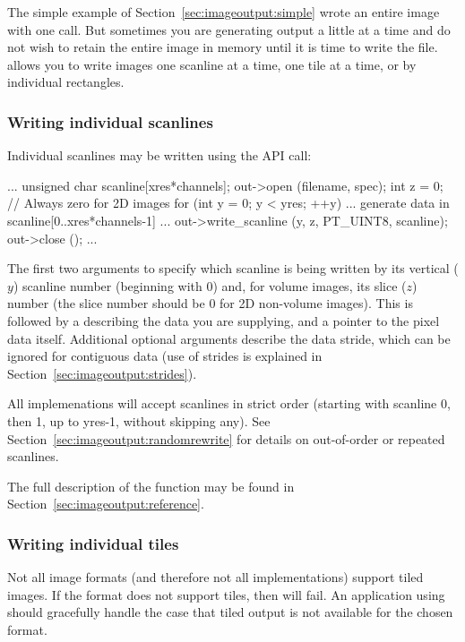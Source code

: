 The simple example of Section~\ref{sec:imageoutput:simple} wrote an
entire image with one call.  But sometimes you are generating output a
little at a time and do not wish to retain the entire image in memory
until it is time to write the file.  \product allows you to write images
one scanline at a time, one tile at a time, or by individual rectangles.

\subsubsection{Writing individual scanlines}

Individual scanlines may be written using the \writescanline API
call:

\begin{code}
        ...
        unsigned char scanline[xres*channels];
        out->open (filename, spec);
        int z = 0;   // Always zero for 2D images
        for (int y = 0;  y < yres;  ++y) {
            ... generate data in scanline[0..xres*channels-1] ...
            out->write_scanline (y, z, PT_UINT8, scanline);
        }
        out->close ();
        ...
\end{code}

The first two arguments to \writescanline specify which scanline is
being written by its vertical ($y$) scanline number (beginning with 0)
and, for volume images, its slice ($z$) number (the slice number should
be 0 for 2D non-volume images).  This is followed by a \ParamBaseType
describing the data you are supplying, and a pointer to the pixel data
itself.  Additional optional arguments describe the data stride, which
can be ignored for contiguous data (use of strides is explained in
Section~\ref{sec:imageoutput:strides}).

All \ImageOutput implemenations will accept scanlines in strict order
(starting with scanline 0, then 1, up to {\kw yres-1}, without skipping
any).  See Section~\ref{sec:imageoutput:randomrewrite} for details
on out-of-order or repeated scanlines.

The full description of the \writescanline function may be found
in Section~\ref{sec:imageoutput:reference}.

\subsubsection{Writing individual tiles}

Not all image formats (and therefore not all \ImageOutput
implementations) support tiled images.  If the format does not support
tiles, then \writetile will fail.  An application using \product
should gracefully handle the case that tiled output is not available for
the chosen format.

